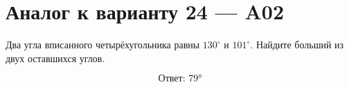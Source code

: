 


\section*{Аналог к варианту 24 — A02}
Два угла вписанного четырёхугольника равны \(130^\circ\) и \(101^\circ\). Найдите больший из двух оставшихся углов.
\begin{center}\figCyclicTwoAngles\end{center}
\[\boxed{\text{Ответ: }79°}\]

